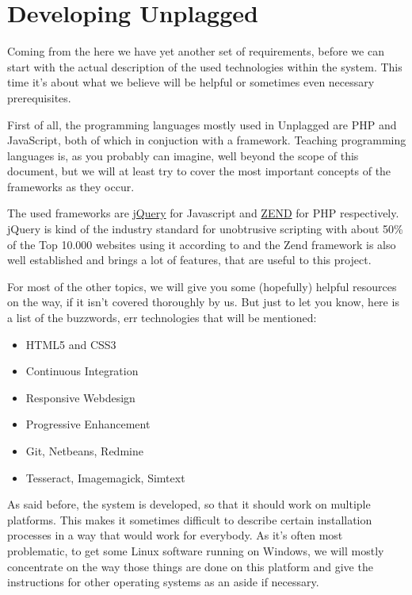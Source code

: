 \chapter{Developing Unplagged}\label{chap:developingUnplagged}

Coming from the  here we have yet another set of requirements, before we can
start with the actual description of the used technologies within the system. This time it's 
about what we believe will be helpful or sometimes even necessary prerequisites. 

First of all, the programming languages mostly used in Unplagged are PHP and JavaScript, both of which in conjuction
with a framework. Teaching programming languages is, as you probably can imagine, well beyond the scope of this document,
but we will at least try to cover the most important concepts of the frameworks as they occur. 

The used frameworks are 
\href{http://jquery.com/}{jQuery} for Javascript and \href{http://framework.zend.com/docs/overview}{ZEND} for PHP 
respectively. jQuery is kind of the industry standard for unobtrusive scripting with about 50\% 
of the Top 10.000 websites using it according to \citet{Trends} and the Zend framework is also well established and
brings a lot of features, that are useful to this project.

For most of the other topics, we will give you some (hopefully) helpful resources on the way, if it isn't covered 
thoroughly by us. But just to let you
know, here is a list of the buzzwords, err technologies that will be mentioned:

\begin{itemize}
\item HTML5 and CSS3
\item Continuous Integration
\item Responsive Webdesign
\item Progressive Enhancement
\item Git, Netbeans, Redmine
\item Tesseract, Imagemagick, Simtext
\end{itemize}

As said before, the system is developed, so that it should work on multiple platforms. 
This makes it sometimes difficult to describe certain installation processes in a way that would work for everybody. As
it's often most problematic, to get some Linux software running on Windows, we will mostly concentrate on the way those
things are done on this platform and give the instructions for other operating systems as an aside if necessary.

